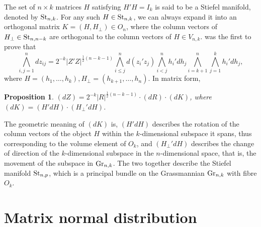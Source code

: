 \documentclass{amsart}
\newtheorem{proposition}[theorem]{Proposition}
\theoremstyle{definition}
\newtheorem{definition}{Definition}
\numberwithin{equation}{section}
\begin{document}
The set of $n\times k$ matrices $H$ satisfying $H'H = I_k$ is said to be a Stiefel manifold, denoted by ${\rm St}_{n,k}$. For any such $H\in {\rm St}_{n,k}$, we can always expand it into an orthogonal matrix $K = (H,H_\perp) \in O_n$, where the column vectors of $H_\perp \in {\rm St}_{n,n-k}$ are orthogonal to the column vectors of $H\in V_{n,k}$. \cite[Equation 8.19]{james1954} was the first to prove that
    \begin{equation*} \bigwedge_{i,j=1}^n dz_{ij} = 2^{-k} |Z'Z|^{\frac{1}{2}(n-k-1)} \bigwedge_{i\le j}^n d(z_i'z_j) \bigwedge_{i< j}^n h_i'dh_j \bigwedge_{i=k+1}^n \bigwedge_{j=1}^k h_i'dh_j, \label{eq: james1954}\end{equation*}
    where $H = (h_1,\dots,h_k), H_\perp = (h_{k+1},\dots,h_n)$. In matrix form,
\begin{proposition}\label{prop: herz55}
$(dZ) = 2^{-k} |R|^{\frac{1}{2}(n-k-1)} \cdot (dR) \cdot (dK)$, where $(dK) = {(H'dH)} \cdot {(H_\perp'dH)}$.
\end{proposition}
The geometric meaning of $(dK)$ is, \({(H'dH)} \) describes the rotation of the column vectors of the object \( H \) within the \(k \)-dimensional subspace it spans, thus corresponding to the volume element of $O_k$, and \( {(H_\perp'dH)} \) describes the change of direction of the \(k\)-dimensional subspace in the \( n \)-dimensional space, that is, the movement of the subspace in \({\rm Gr}_{n,k} \). The two together describe the Stiefel manifold \( {\rm St}_{n,p} \), which is a principal bundle on the Grassmannian ${\rm Gr}_{n,k}$ with fibre \(O_k\).





\section{Matrix normal distribution}



\end{document}
